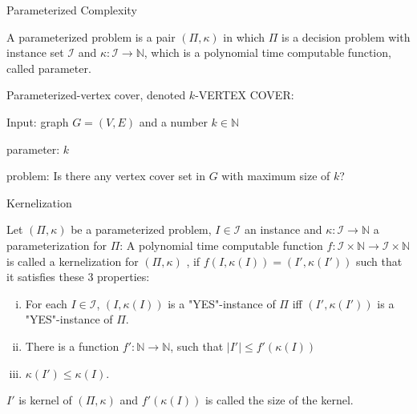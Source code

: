 \documentclass{beamer}
\begin{document}
\begin{frame}{Parameterized Complexity}
\begin{definition}
A \color{red} parameterized problem \color{black} is a pair $(\Pi, \kappa)$ in which $\Pi$ is a
decision problem with instance set $\mathcal{I}$ and $\kappa : \mathcal{I} \to \mathbb{N}$, which is a polynomial
time computable function, called parameter.
\end{definition}
\pause
\begin{example}
Parameterized-vertex cover, denoted $k$-VERTEX COVER:

Input: graph $G = (V, E)$ and a number $k \in \mathbb{N}$

parameter: $k$

problem: Is there any vertex cover set in $G$ with maximum size of $k$?
\end{example}

\end{frame}

\begin{frame}{Kernelization}

\begin{definition}
Let $(\Pi, \kappa)$ be a parameterized problem, $I\in\mathcal{I}$ an instance and $\kappa: \mathcal{I} \to \mathbb{N}$ a parameterization for $\Pi$:
\pause
A polynomial time computable function $f : \mathcal{I} \times \mathbb{N} \to \mathcal{I} \times \mathbb{N}$ is called a
\color{red} kernelization \color{black} for $(\Pi, \kappa)$ , if $f(I, \kappa(I)) = (I', \kappa(I'))$ such that it satisfies these 3 properties:
\pause
\begin{enumerate}[(i)]
\item For each $I \in \mathcal{I}$, $(I, \kappa(I))$ is a "YES"-instance of $\Pi$ iff $(I', \kappa(I'))$ is a "YES"-instance of $\Pi$.
\pause
\item There is a function $f': \mathbb{N} \to \mathbb{N}$, such that $|I'| \leq f'(\kappa(I))$
\pause
\item $\kappa(I')\leq \kappa(I)$.
\end{enumerate}
\pause
$I'$ is \color{red} kernel \color{black} of $(\Pi, \kappa)$ and $f'(\kappa(I))$ is called the size of the kernel.

\end{definition}

\end{frame}
\end{document}
